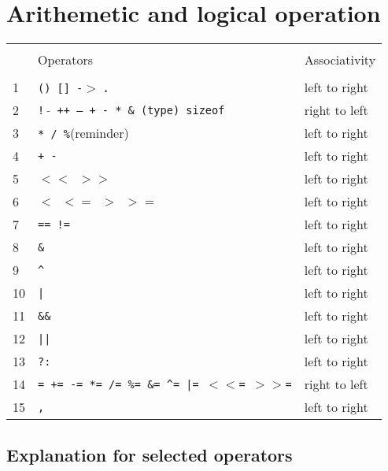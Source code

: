 \section{Arithemetic and logical operation}

    \begin{tabularx}{\linewidth}{l|lX}
        \hline\\
        & Operators & Associativity \\
        \hline \\
        1 & \texttt{() [] -$>$} \textbf{.} & left to right\\
        2 & \texttt{! $\tilde{}$ ++ -- + - * \& (type) sizeof} & right to left\\
        3 & \texttt{* / \%}(reminder) & left to right\\
        4 & \texttt{+ -} & left to right \\
        5 & \texttt{$<<$ $>>$} & left to right \\
        6 & \texttt{$<$ $<=$ $>$ $>=$}  & left to right\\
        7 & \texttt{== !=} & left to right\\
        8 & \texttt{\&} & left to right \\
        9 & \texttt{\^} & left to right \\
        10 & \texttt{|} & left to right\\
        11 & \texttt{\&\&} & left to right\\
        12 & \texttt{||} & left to right \\
        13 & \texttt{?:} & left to right \\
        14 & \texttt{= += -= *= /= \%= \&= \^{}= |= $<<$= $>>$=} & right to left\\
        15 & \texttt{,} & left to right\\
        \hline
    \end{tabularx}

    \subsection{Explanation for selected operators}


